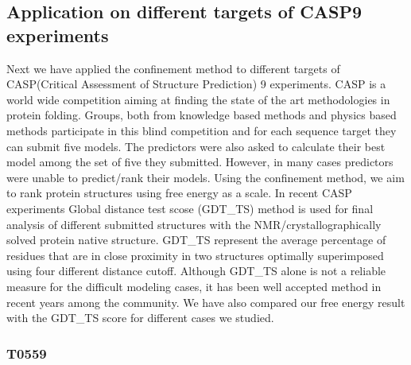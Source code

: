 \documentclass[12pt]{article}
\begin{document}
\subsection{Application on different targets of CASP9 experiments}

Next we have applied the confinement method to different targets of CASP(Critical Assessment of Structure Prediction) 9 experiments. 
CASP is a world wide competition aiming at finding the state of the art methodologies in protein folding. Groups, both from knowledge 
based methods and physics based methods participate in this blind competition and for each sequence target they can submit 
five models. The predictors were also asked to calculate their best model among the set of five they submitted. However, in many cases
predictors were unable to predict/rank their models. Using the confinement method, we aim to rank protein structures using free 
energy as a scale. In recent CASP experiments Global distance test scose (GDT\_TS) method is used for final analysis of different
submitted structures with the NMR/crystallographically solved protein native structure. GDT\_TS represent the average 
percentage of residues that are in close proximity in two structures optimally superimposed
using four different distance cutoff. Although GDT\_TS alone is not a reliable measure for the difficult modeling cases, it has 
been well accepted method in recent years among the community. We have also compared our free energy result with the 
GDT\_TS score for different cases we studied.  



\subsubsection{T0559}
\end{document}
